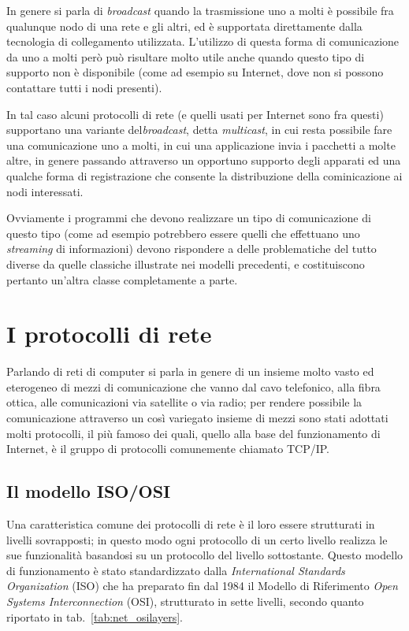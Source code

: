 
In genere si parla di \textit{broadcast} quando la trasmissione uno a molti è
possibile fra qualunque nodo di una rete e gli altri, ed è supportata
direttamente dalla tecnologia di collegamento utilizzata. L'utilizzo di questa
forma di comunicazione da uno a molti però può risultare molto utile anche
quando questo tipo di supporto non è disponibile (come ad esempio su Internet,
dove non si possono contattare tutti i nodi presenti). 


In tal caso alcuni protocolli di rete (e quelli usati per Internet sono fra
questi) supportano una variante del\textit{broadcast}, detta
\textit{multicast}, in cui resta possibile fare una comunicazione uno a molti,
in cui una applicazione invia i pacchetti a molte altre, in genere passando
attraverso un opportuno supporto degli apparati ed una qualche forma di
registrazione che consente la distribuzione della cominicazione ai nodi
interessati. 


Ovviamente i programmi che devono realizzare un tipo di comunicazione di
questo tipo (come ad esempio potrebbero essere quelli che effettuano uno
\textit{streaming} di informazioni) devono rispondere a delle problematiche
del tutto diverse da quelle classiche illustrate nei modelli precedenti, e
costituiscono pertanto un'altra classe completamente a parte.


\section{I protocolli di rete}
\label{sec:net_protocols}

Parlando di reti di computer si parla in genere di un insieme molto vasto ed
eterogeneo di mezzi di comunicazione che vanno dal cavo telefonico, alla fibra
ottica, alle comunicazioni via satellite o via radio; per rendere possibile la
comunicazione attraverso un così variegato insieme di mezzi sono stati
adottati molti protocolli, il più famoso dei quali, quello alla base del
funzionamento di Internet, è il gruppo di protocolli comunemente chiamato
TCP/IP.

\subsection{Il modello ISO/OSI}
\label{sec:net_iso_osi}

Una caratteristica comune dei protocolli di rete è il loro essere strutturati
in livelli sovrapposti; in questo modo ogni protocollo di un certo livello
realizza le sue funzionalità basandosi su un protocollo del livello
sottostante.  Questo modello di funzionamento è stato standardizzato dalla
\textit{International Standards Organization} (ISO) che ha preparato fin dal
1984 il Modello di Riferimento \textit{Open Systems Interconnection} (OSI),
strutturato in sette livelli, secondo quanto riportato in
tab.~\ref{tab:net_osilayers}.


